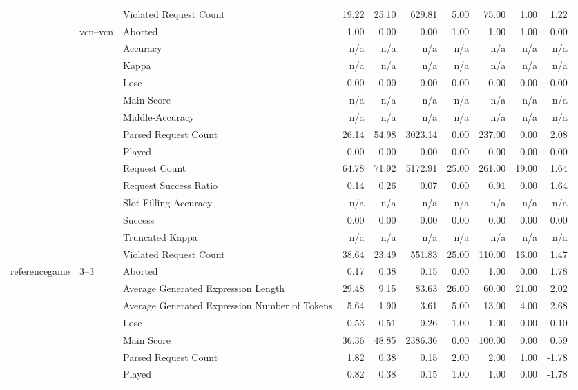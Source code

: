 \begin{tabular}{lllrrrrrrr}
 &  & Violated Request Count & 19.22 & 25.10 & 629.81 & 5.00 & 75.00 & 1.00 & 1.22 \\
\cline{2-10}
 & \multirow[t]{14}{*}{vcn--vcn} & Aborted & 1.00 & 0.00 & 0.00 & 1.00 & 1.00 & 1.00 & 0.00 \\
 &  & Accuracy & n/a & n/a & n/a & n/a & n/a & n/a & n/a \\
 &  & Kappa & n/a & n/a & n/a & n/a & n/a & n/a & n/a \\
 &  & Lose & 0.00 & 0.00 & 0.00 & 0.00 & 0.00 & 0.00 & 0.00 \\
 &  & Main Score & n/a & n/a & n/a & n/a & n/a & n/a & n/a \\
 &  & Middle-Accuracy & n/a & n/a & n/a & n/a & n/a & n/a & n/a \\
 &  & Parsed Request Count & 26.14 & 54.98 & 3023.14 & 0.00 & 237.00 & 0.00 & 2.08 \\
 &  & Played & 0.00 & 0.00 & 0.00 & 0.00 & 0.00 & 0.00 & 0.00 \\
 &  & Request Count & 64.78 & 71.92 & 5172.91 & 25.00 & 261.00 & 19.00 & 1.64 \\
 &  & Request Success Ratio & 0.14 & 0.26 & 0.07 & 0.00 & 0.91 & 0.00 & 1.64 \\
 &  & Slot-Filling-Accuracy & n/a & n/a & n/a & n/a & n/a & n/a & n/a \\
 &  & Success & 0.00 & 0.00 & 0.00 & 0.00 & 0.00 & 0.00 & 0.00 \\
 &  & Truncated Kappa & n/a & n/a & n/a & n/a & n/a & n/a & n/a \\
 &  & Violated Request Count & 38.64 & 23.49 & 551.83 & 25.00 & 110.00 & 16.00 & 1.47 \\
\cline{1-10} \cline{2-10}
\multirow[t]{121}{*}{referencegame} & \multirow[t]{11}{*}{3--3} & Aborted & 0.17 & 0.38 & 0.15 & 0.00 & 1.00 & 0.00 & 1.78 \\
 &  & Average Generated Expression Length & 29.48 & 9.15 & 83.63 & 26.00 & 60.00 & 21.00 & 2.02 \\
 &  & Average Generated Expression Number of Tokens & 5.64 & 1.90 & 3.61 & 5.00 & 13.00 & 4.00 & 2.68 \\
 &  & Lose & 0.53 & 0.51 & 0.26 & 1.00 & 1.00 & 0.00 & -0.10 \\
 &  & Main Score & 36.36 & 48.85 & 2386.36 & 0.00 & 100.00 & 0.00 & 0.59 \\
 &  & Parsed Request Count & 1.82 & 0.38 & 0.15 & 2.00 & 2.00 & 1.00 & -1.78 \\
 &  & Played & 0.82 & 0.38 & 0.15 & 1.00 & 1.00 & 0.00 & -1.78 \\

\end{tabular}
